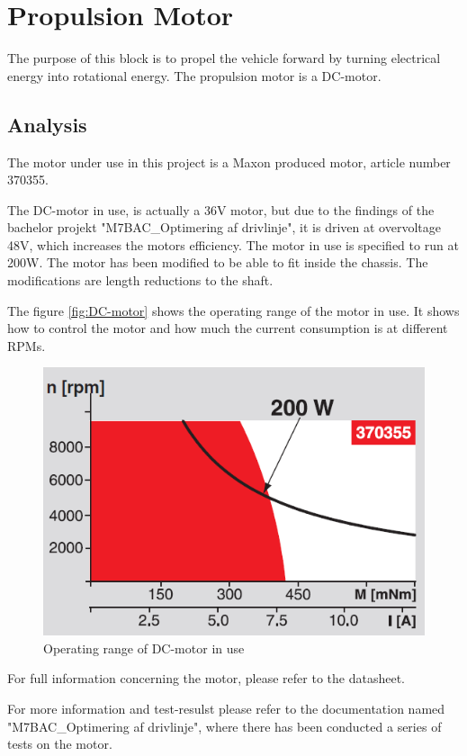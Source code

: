 \section{Propulsion Motor}
The purpose of this block is to propel the vehicle forward by turning electrical energy into rotational energy. The propulsion motor is a DC-motor. 

\subsection{Analysis}
The motor under use in this project is a Maxon produced motor, article number 370355.

The DC-motor in use, is actually a 36V motor, but due to the findings of the bachelor projekt "M7BAC\_Optimering af drivlinje", it is driven at overvoltage 48V, which increases the motors efficiency. The motor in use is specified to run at 200W. 
The motor has been modified to be able to fit inside the chassis. The modifications are length reductions to the shaft.

The figure \vref{fig:DC-motor} shows the operating range of the motor in use. It shows how to control the motor and how much the current consumption is at different RPMs.

\begin{figure}[H]
	\centering
	\includegraphics[width=0.6\linewidth]{Hardware/Pictures/DC-motor_diagram}
	\caption{Operating range of DC-motor in use}
	\label{fig:DC-motor}
\end{figure}

For full information concerning the motor, please refer to the datasheet. 

For more information and test-resulst please refer to the documentation named "M7BAC\_Optimering af drivlinje", where there has been conducted a series of tests on the motor. 